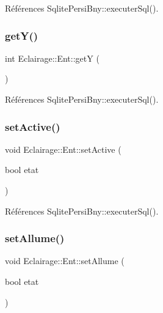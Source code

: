 Références Sqlite\+Persi\+Bny\+::executer\+Sql().

\mbox{\label{classEclairage_1_1Ent_a12a54fa5d966278eefc4b035142ade70}} 
\subsubsection{\texorpdfstring{get\+Y()}{getY()}}
{\footnotesize\ttfamily int Eclairage\+::\+Ent\+::getY (\begin{DoxyParamCaption}{ }\end{DoxyParamCaption})\hspace{0.3cm}{\ttfamily [virtual]}}



Références Sqlite\+Persi\+Bny\+::executer\+Sql().

\mbox{\label{classEclairage_1_1Ent_a1e9471a412f746a2284778c8d9548499}} 
\subsubsection{\texorpdfstring{set\+Active()}{setActive()}}
{\footnotesize\ttfamily void Eclairage\+::\+Ent\+::set\+Active (\begin{DoxyParamCaption}\item[{bool}]{etat }\end{DoxyParamCaption})\hspace{0.3cm}{\ttfamily [virtual]}}



Références Sqlite\+Persi\+Bny\+::executer\+Sql().

\mbox{\label{classEclairage_1_1Ent_a3c9d21bd3c725857050e39eb449d1ad5}} 
\subsubsection{\texorpdfstring{set\+Allume()}{setAllume()}}
{\footnotesize\ttfamily void Eclairage\+::\+Ent\+::set\+Allume (\begin{DoxyParamCaption}\item[{bool}]{etat }\end{DoxyParamCaption})\hspace{0.3cm}{\ttfamily [virtual]}}



